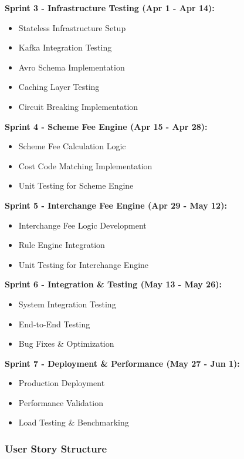 \textbf{Sprint 3 - Infrastructure Testing (Apr 1 - Apr 14):}
\begin{itemize}
    \item Stateless Infrastructure Setup
    \item Kafka Integration Testing
    \item Avro Schema Implementation
    \item Caching Layer Testing
    \item Circuit Breaking Implementation
\end{itemize}

\textbf{Sprint 4 - Scheme Fee Engine (Apr 15 - Apr 28):}
\begin{itemize}
    \item Scheme Fee Calculation Logic
    \item Cost Code Matching Implementation
    \item Unit Testing for Scheme Engine
\end{itemize}

\textbf{Sprint 5 - Interchange Fee Engine (Apr 29 - May 12):}
\begin{itemize}
    \item Interchange Fee Logic Development
    \item Rule Engine Integration
    \item Unit Testing for Interchange Engine
\end{itemize}

\textbf{Sprint 6 - Integration \& Testing (May 13 - May 26):}
\begin{itemize}
    \item System Integration Testing
    \item End-to-End Testing
    \item Bug Fixes \& Optimization
\end{itemize}

\textbf{Sprint 7 - Deployment \& Performance (May 27 - Jun 1):}
\begin{itemize}
    \item Production Deployment
    \item Performance Validation
    \item Load Testing \& Benchmarking
\end{itemize}

\subsubsection{User Story Structure}

